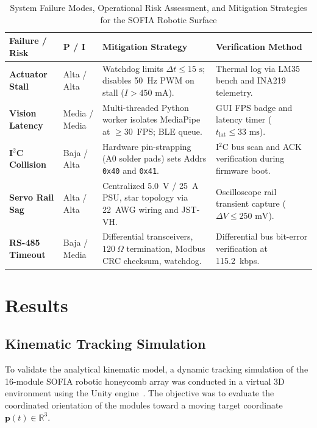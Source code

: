 \documentclass[lettersize,journal]{IEEEtran}
\begin{document}
	\begin{table}[!t]
		\centering
		\caption{System Failure Modes, Operational Risk Assessment, and Mitigation Strategies for the SOFIA Robotic Surface}
		\label{tab:risk_matrix}
		\scriptsize
		\setlength{\tabcolsep}{2pt}
		\renewcommand{\arraystretch}{1.10}
		\begin{tabular}{@{}p{1.6cm} >{\centering\arraybackslash}p{0.8cm} p{3.2cm} p{2.7cm}@{}}
			\toprule
			\textbf{Failure / Risk} & \textbf{P / I} & \textbf{Mitigation Strategy} & \textbf{Verification Method} \\
			\midrule
			\textbf{Actuator Stall} & Alta / Alta & Watchdog limits $\Delta t \le 15\text{ s}$; disables 50~Hz PWM on stall ($I > 450\text{ mA}$). & Thermal log via LM35 bench and INA219 telemetry. \\
			
			\textbf{Vision Latency} & Media / Media & Multi-threaded Python worker isolates MediaPipe at $\ge 30$~FPS; BLE queue. & GUI FPS badge and latency timer ($t_{\text{lat}} \le 33\text{ ms}$). \\
			
			\textbf{I$^2$C Collision} & Baja / Alta & Hardware pin-strapping (A0 solder pads) sets Addrs \texttt{0x40} and \texttt{0x41}. & I$^2$C bus scan and ACK verification during firmware boot. \\
			
			\textbf{Servo Rail Sag} & Alta / Alta & Centralized 5.0~V / 25~A PSU, star topology via 22~AWG wiring and JST-VH. & Oscilloscope rail transient capture ($\Delta V \le 250\text{ mV}$). \\
			
			\textbf{RS-485 Timeout} & Baja / Media & Differential transceivers, $120~\Omega$ termination, Modbus CRC checksum, watchdog. & Differential bus bit-error verification at 115.2~kbps. \\
			\bottomrule
		\end{tabular}
	\end{table}
	
	\section{Results}
	\label{sec:results}
	
	\subsection{Kinematic Tracking Simulation}
	\label{sec:results_simulation}
	To validate the analytical kinematic model, a dynamic tracking
	simulation of the 16-module SOFIA robotic honeycomb array was
	conducted in a virtual 3D environment using the Unity engine~\cite{unity2023engine}. The objective was to evaluate
	the coordinated orientation of the modules toward a moving target
	coordinate $\mathbf{p}(t) \in \mathbb{R}^3$.
	
\end{document}
